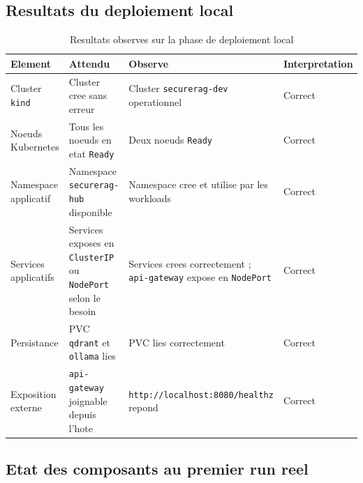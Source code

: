 \subsection{Resultats du deploiement local}

\begin{table}[h]
\centering
\begin{tabular}{|p{3.2cm}|p{4.0cm}|p{4.3cm}|p{3.3cm}|}
\hline
\textbf{Element} & \textbf{Attendu} & \textbf{Observe} & \textbf{Interpretation} \\
\hline
Cluster \texttt{kind} & Cluster cree sans erreur & Cluster \texttt{securerag-dev} operationnel & Correct \\
\hline
Noeuds Kubernetes & Tous les noeuds en etat \texttt{Ready} & Deux noeuds \texttt{Ready} & Correct \\
\hline
Namespace applicatif & Namespace \texttt{securerag-hub} disponible & Namespace cree et utilise par les workloads & Correct \\
\hline
Services applicatifs & Services exposes en \texttt{ClusterIP} ou \texttt{NodePort} selon le besoin & Services crees correctement ; \texttt{api-gateway} expose en \texttt{NodePort} & Correct \\
\hline
Persistance & PVC \texttt{qdrant} et \texttt{ollama} lies & PVC lies correctement & Correct \\
\hline
Exposition externe & \texttt{api-gateway} joignable depuis l'hote & \texttt{http://localhost:8080/healthz} repond & Correct \\
\hline
\end{tabular}
\caption{Resultats observes sur la phase de deploiement local}
\end{table}

\subsection{Etat des composants au premier run reel}

